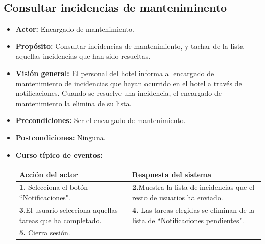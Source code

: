\documentclass[spanish,a4paper,11pt, twoside]{report}	%
\begin{document}
		\subsection{Consultar incidencias de manteniminento}
			\begin{itemize}
			\item \textbf{Actor: }Encargado de mantenimiento.
			\item \textbf{Propósito: }Consultar incidencias de mantenimiento, y tachar de la lista aquellas incidencias que han sido resueltas. 
			\item \textbf{Visión general: }El personal del hotel informa al encargado de mantenimiento de incidencias que hayan ocurrido en el hotel a través de notificaciones. Cuando se resuelve una incidencia, el encargado de mantenimiento la elimina de su lista. 
			\item \textbf{Precondiciones:} Ser el encargado de mantenimiento.
			\item \textbf{Postcondiciones:} Ninguna.
			\item \textbf{Curso típico de eventos:} \\ 
			\begin{tabular}{|p{6cm}||p{6cm}|}
				\hline
				\textbf{Acción del actor} & \textbf{Respuesta del sistema} \\ \hline \hline
				\textbf{1.} Selecciona el botón “Notificaciones". & \textbf{2.}Muestra la lista de incidencias que el resto de usuarios ha enviado.\\ \hline 
				\textbf{3.}El usuario selecciona aquellas tareas que ha completado. & \textbf{4.} Las tareas elegidas se eliminan de la lista de “Notificaciones pendientes".\\ \hline
				\textbf{5.} Cierra sesión. & \\ \hline
			\end{tabular}
		\end {itemize}
		

	\hspace{1 true cm}	
\end{document}
